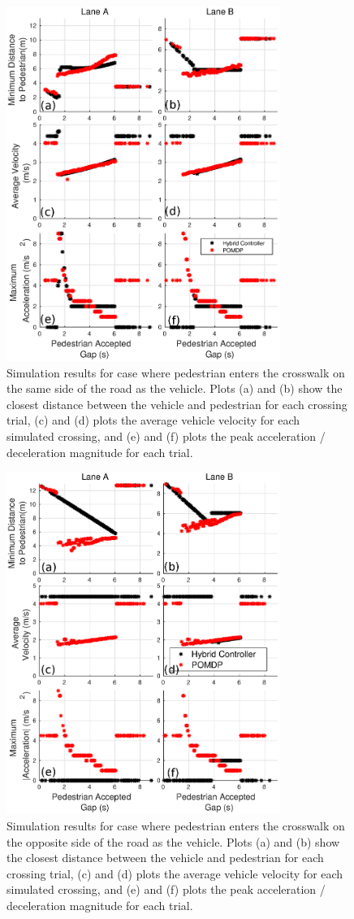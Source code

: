 \documentclass[letterpaper, 10 pt, conference]{ieeeconf} %
\begin{document}
\begin{figure}
\centering
\includegraphics[width=3.5in]{figures/velPlotBoth.eps}
\caption{Simulation results for case where pedestrian enters the crosswalk on the same side of the road as the vehicle. Plots (a) and (b) show the closest distance between the vehicle and pedestrian for each crossing trial, (c) and (d) plots the average vehicle velocity for each simulated crossing, and (e) and (f) plots the peak acceleration / deceleration magnitude for each trial.}
\label{fig:velPlot1}
\end{figure}

\begin{figure}
\centering
\includegraphics[width=3.5in]{figures/velPlot2Both.eps}
\caption{Simulation results for case where pedestrian enters the crosswalk on the opposite side of the road as the vehicle. Plots (a) and (b) show the closest distance between the vehicle and pedestrian for each crossing trial, (c) and (d) plots the average vehicle velocity for each simulated crossing, and (e) and (f) plots the peak acceleration / deceleration magnitude for each trial.}
\label{fig:velPlot2}
\end{figure}
\end{document}
